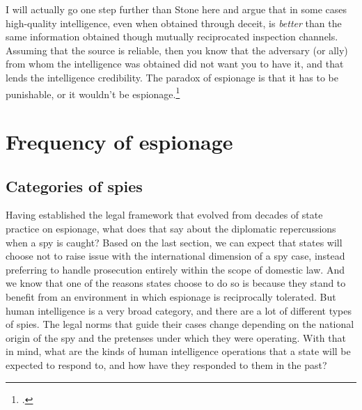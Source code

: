 \documentclass{report}
\begin{document}
\begin{refsegment}
I will actually go one step further than Stone here and argue that in some cases high-quality intelligence, even when obtained through deceit, is \emph{better} than the same information obtained though mutually reciprocated inspection channels. Assuming that the source is reliable, then you know that the adversary (or ally) from whom the intelligence was obtained did not want you to have it, and that lends the intelligence credibility. The paradox of espionage is that it has to be punishable, or it wouldn't be espionage.\footcite[p.~347]{demarest_espionage_1995}


\section{Frequency of espionage}
\subsection{Categories of spies}
Having established the legal framework that evolved from decades of state practice on espionage, what does that say about the diplomatic repercussions when a spy is caught? Based on the last section, we can expect that states will choose not to raise issue with the international dimension of a spy case, instead preferring to handle prosecution entirely within the scope of domestic law. And we know that one of the reasons states choose to do so is because they stand to benefit from an environment in which espionage is reciprocally tolerated. But human intelligence is a very broad category, and there are a lot of different types of spies. The legal norms that guide their cases change depending on the national origin of the spy and the pretenses under which they were operating. With that in mind, what are the kinds of human intelligence operations that a state will be expected to respond to, and how have they responded to them in the past?


\end{refsegment}
\end{document}
